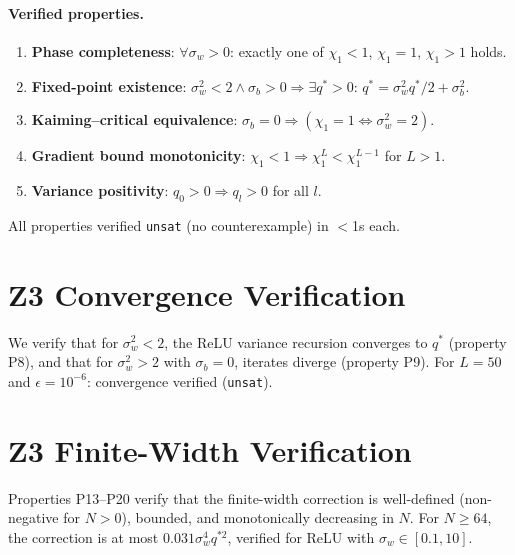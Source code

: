 \documentclass[10pt]{article}
\begin{document}
\paragraph{Verified properties.}
\begin{enumerate}[nosep]
    \item \textbf{Phase completeness}: $\forall \sigma_w > 0$: exactly one of $\chi_1 < 1$, $\chi_1 = 1$, $\chi_1 > 1$ holds.
    \item \textbf{Fixed-point existence}: $\sigma_w^2 < 2 \land \sigma_b > 0 \Rightarrow \exists q^* > 0$: $q^* = \sigma_w^2 q^*/2 + \sigma_b^2$.
    \item \textbf{Kaiming--critical equivalence}: $\sigma_b = 0 \Rightarrow (\chi_1 = 1 \Leftrightarrow \sigma_w^2 = 2)$.
    \item \textbf{Gradient bound monotonicity}: $\chi_1 < 1 \Rightarrow \chi_1^L < \chi_1^{L-1}$ for $L > 1$.
    \item \textbf{Variance positivity}: $q_0 > 0 \Rightarrow q_l > 0$ for all $l$.
\end{enumerate}

All properties verified \texttt{unsat} (no counterexample) in $<$1s each.

\section{Z3 Convergence Verification}
\label{app:z3-convergence}

We verify that for $\sigma_w^2 < 2$, the ReLU variance recursion converges to $q^*$ (property P8), and that for $\sigma_w^2 > 2$ with $\sigma_b = 0$, iterates diverge (property P9).
For $L = 50$ and $\epsilon = 10^{-6}$: convergence verified (\texttt{unsat}).

\section{Z3 Finite-Width Verification}
\label{app:z3-finite-width}

Properties P13--P20 verify that the finite-width correction is well-defined (non-negative for $N > 0$), bounded, and monotonically decreasing in $N$.
For $N \geq 64$, the correction is at most $0.031 \sigma_w^4 q^{*2}$, verified for ReLU with $\sigma_w \in [0.1, 10]$.
\end{document}
